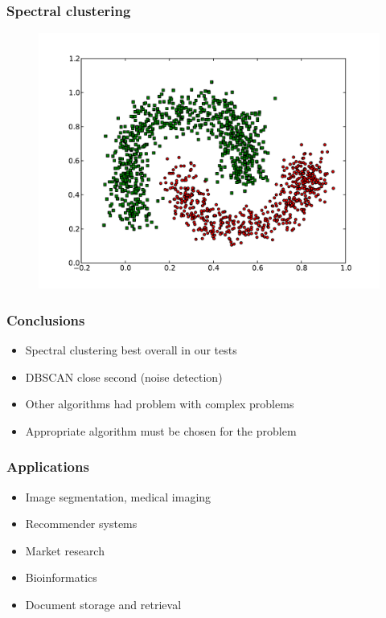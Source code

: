 \documentclass{beamer}
\begin{document}
\begin{frame}
\frametitle{Spectral clustering}
    \begin{figure}[]
    \includegraphics[scale=0.5]{spectral_half-moons.pdf}
    \end{figure}
\end{frame}


\begin{frame}
\frametitle{Conclusions}
    \begin{itemize}
    \item Spectral clustering best overall in our tests
    \item DBSCAN close second (noise detection)
    \item Other algorithms had problem with complex problems
    \item Appropriate algorithm must be chosen for the problem
    \end{itemize}
\end{frame}


\begin{frame}
\frametitle{Applications}
    \begin{itemize}
    \item Image segmentation, medical imaging
    \item Recommender systems
    \item Market research
    \item Bioinformatics
    \item Document storage and retrieval
    \end{itemize}
\end{frame}
\end{document}
